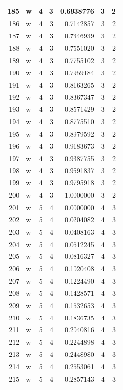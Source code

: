 \documentclass[
  letterpaper,
  DIV=11,
  numbers=noendperiod]{scrreprt}
\begin{document}
\begin{table}
\begin{tabular}[t]{r|l|r|r|r|r|r}
\hline
185 & w & 4 & 3 & 0.6938776 & 3 & 2\\
\hline
186 & w & 4 & 3 & 0.7142857 & 3 & 2\\
\hline
187 & w & 4 & 3 & 0.7346939 & 3 & 2\\
\hline
188 & w & 4 & 3 & 0.7551020 & 3 & 2\\
\hline
189 & w & 4 & 3 & 0.7755102 & 3 & 2\\
\hline
190 & w & 4 & 3 & 0.7959184 & 3 & 2\\
\hline
191 & w & 4 & 3 & 0.8163265 & 3 & 2\\
\hline
192 & w & 4 & 3 & 0.8367347 & 3 & 2\\
\hline
193 & w & 4 & 3 & 0.8571429 & 3 & 2\\
\hline
194 & w & 4 & 3 & 0.8775510 & 3 & 2\\
\hline
195 & w & 4 & 3 & 0.8979592 & 3 & 2\\
\hline
196 & w & 4 & 3 & 0.9183673 & 3 & 2\\
\hline
197 & w & 4 & 3 & 0.9387755 & 3 & 2\\
\hline
198 & w & 4 & 3 & 0.9591837 & 3 & 2\\
\hline
199 & w & 4 & 3 & 0.9795918 & 3 & 2\\
\hline
200 & w & 4 & 3 & 1.0000000 & 3 & 2\\
\hline
201 & w & 5 & 4 & 0.0000000 & 4 & 3\\
\hline
202 & w & 5 & 4 & 0.0204082 & 4 & 3\\
\hline
203 & w & 5 & 4 & 0.0408163 & 4 & 3\\
\hline
204 & w & 5 & 4 & 0.0612245 & 4 & 3\\
\hline
205 & w & 5 & 4 & 0.0816327 & 4 & 3\\
\hline
206 & w & 5 & 4 & 0.1020408 & 4 & 3\\
\hline
207 & w & 5 & 4 & 0.1224490 & 4 & 3\\
\hline
208 & w & 5 & 4 & 0.1428571 & 4 & 3\\
\hline
209 & w & 5 & 4 & 0.1632653 & 4 & 3\\
\hline
210 & w & 5 & 4 & 0.1836735 & 4 & 3\\
\hline
211 & w & 5 & 4 & 0.2040816 & 4 & 3\\
\hline
212 & w & 5 & 4 & 0.2244898 & 4 & 3\\
\hline
213 & w & 5 & 4 & 0.2448980 & 4 & 3\\
\hline
214 & w & 5 & 4 & 0.2653061 & 4 & 3\\
\hline
215 & w & 5 & 4 & 0.2857143 & 4 & 3\\

\end{tabular}
\end{table}
\end{document}
